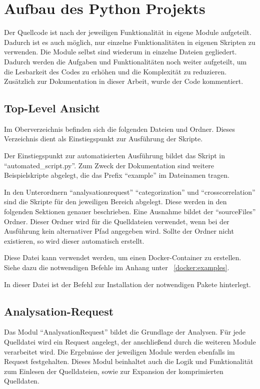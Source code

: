 \section{Aufbau des Python Projekts}
Der Quellcode ist nach der jeweiligen Funktionalität in eigene Module aufgeteilt.
Dadurch ist es auch möglich, nur einzelne Funktionalitäten in eigenen Skripten zu verwenden.
Die Module selbst sind wiederum in einzelne Dateien gegliedert.
Dadurch werden die Aufgaben und Funktionalitäten noch weiter aufgeteilt, um die Lesbarkeit des Codes zu erhöhen und die Komplexität zu reduzieren.
Zusätzlich zur Dokumentation in dieser Arbeit, wurde der Code kommentiert.

\subsection{Top-Level Ansicht}
Im Oberverzeichnis befinden sich die folgenden Dateien und Ordner. Dieses Verzeichnis dient als Einstiegspunkt zur Ausführung der Skripte.
\begin{description}[style=nextline]
	\item[Skriptdateien] Der Einstiegspunkt zur automatisierten Ausführung bildet das Skript in \enquote{automated\_script.py}. Zum Zweck der Dokumentation sind weitere Beispielskripte abgelegt, die das Prefix \enquote{example} im Dateinamen tragen.
	\item[Unterordner] In den Unterordnern \enquote{analysationrequest} \enquote{categorization} und \enquote{crosscorrelation} sind die Skripte für den jeweiligen Bereich abgelegt. Diese werden in den folgenden Sektionen genauer beschrieben. Eine Ausnahme bildet der \enquote{sourceFiles} Ordner. Dieser Ordner wird für die Quelldateien verwendet, wenn bei der Ausführung kein alternativer Pfad angegeben wird. Sollte der Ordner nicht existieren, so wird dieser automatisch erstellt.
	\item[Docker-File] Diese Datei kann verwendet werden, um einen Docker-Container zu erstellen. Siehe dazu die notwendigen Befehle im Anhang unter ~\ref{docker:examples}.
	\item[Dependencies.txt] In dieser Datei ist der Befehl zur Installation der notwendigen Pakete hinterlegt.
\end{description}

\subsection{Analysation-Request}
Das Modul \enquote{AnalysationRequest} bildet die Grundlage der Analysen.
Für jede Quelldatei wird ein Request angelegt, der anschließend durch die weiteren Module verarbeitet wird.
Die Ergebnisse der jeweiligen Module werden ebenfalls im Request festgehalten.
Dieses Modul beinhaltet auch die Logik und Funktionalität zum Einlesen der Quelldateien, sowie zur Expansion der komprimierten Quelldaten.


